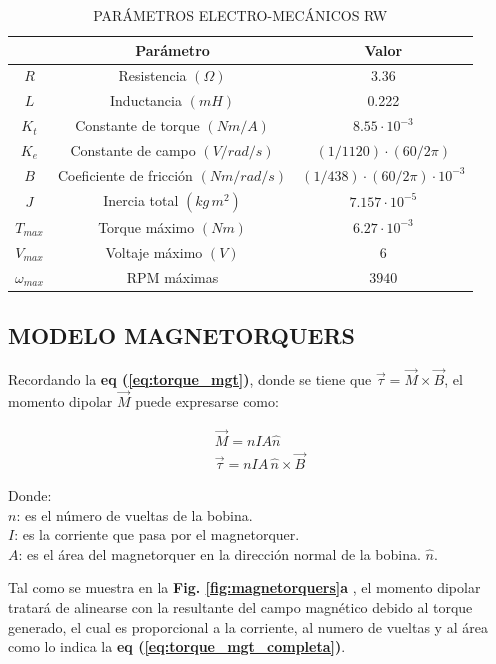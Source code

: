\begin{table}[!ht]
	\caption{\MakeUppercase{Parámetros electro-mecánicos RW }}
	\begin{center}
		\begin{tabular}{ c c c}
			
			&  \textbf{Parámetro} &  \textbf{Valor}\\ \hline
			$R$ &  Resistencia $(\Omega)$ & 3.36\\ 
			$L$ &  Inductancia $(mH)$ & 0.222\\ 
			$K_t$ &  Constante de torque $(Nm/A)$ & $8.55\cdot10^{-3}$ \\ 
			$K_e$ &  Constante de campo $(V/rad/s)$& $(1/1120)\cdot(60/2\pi)$ \\ 
			$B$ &  Coeficiente de fricción $(Nm/rad/s)$& $(1/438)\cdot(60/2\pi)\cdot10^{-3}$ \\
			$J$ &  Inercia total $(kg\,m^2)$& $7.157\cdot10^{-5}$ \\  
			$T_{max}$ & Torque máximo $(Nm)$ & $6.27\cdot10^{-3}$ \\
			$V_{max}$ & Voltaje máximo $(V)$ & $6$ \\
			$\omega_{max}$ & RPM máximas & $3940$ \\ \hline
		\end{tabular}
	\end{center}
	\label{table:motorRW}
\end{table}

\subsection{MODELO MAGNETORQUERS}
Recordando la \textbf{eq (\ref{eq:torque_mgt})}, donde se tiene que $\vec{\tau} =\vec{M}\times\vec{B}$, el momento dipolar $\vec{M}$ puede expresarse como:

\begin{gather}
	\vec{M} = nIA\hat{n}\label{eq:momento_dipolar}\\[10pt]
	\vec{\tau} = nIA\,\hat{n}\times\vec{B}\label{eq:torque_mgt_completa}
\end{gather}

\noindent Donde:\\
$n$: es el número de vueltas de la bobina.\\
$I$: es la corriente que pasa por el magnetorquer.\\
$A$: es el área del magnetorquer en la dirección normal de la bobina. $\hat{n}$.

Tal como se muestra en la \textbf{Fig. \ref{fig:magnetorquers}a} , el momento dipolar tratará de alinearse con la resultante del campo magnético debido al torque generado, el cual es proporcional a la corriente, al numero de vueltas y al área como lo indica la \textbf{eq (\ref{eq:torque_mgt_completa})}.

